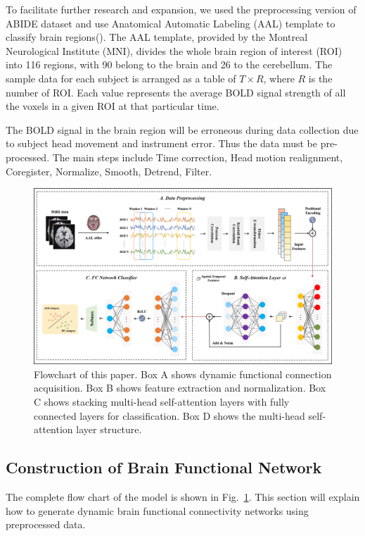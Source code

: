 \documentclass[a4paper]{cas-dc}
\newcommand{\figref}[1]{Fig.~\ref{#1}}
\begin{document}
To facilitate further research and expansion, we used the preprocessing version of ABIDE dataset and use Anatomical Automatic Labeling (AAL) template to classify brain regions(\cite{rolls2015implementation}). The AAL template, provided by the Montreal Neurological Institute (MNI), divides the whole brain region of interest (ROI) into 116 regions, with 90 belong to the brain and 26 to the cerebellum. The sample data for each subject is arranged as a table of $T\times R$, where $R$ is the number of ROI. Each value represents the average BOLD signal strength of all the voxels in a given ROI at that particular time.

The BOLD signal in the brain region will be erroneous during data collection due to subject head movement and instrument error. Thus the data must be pre-processed. The main steps include Time correction, Head motion realignment, Coregister, Normalize, Smooth, Detrend, Filter.

\begin{figure}[t]
	\centering
	\includegraphics[width=\textwidth]{imgs/model.png}
	\caption{Flowchart of this paper. Box A shows dynamic functional connection acquisition. Box B shows feature extraction and normalization. Box C shows stacking multi-head self-attention layers with fully connected layers for classification. Box D shows the multi-head self-attention layer structure.}
	\label{fig1}
\end{figure} 

\subsection{Construction of Brain Functional Network}
The complete flow chart of the model is shown in \figref{fig1}. This section will explain how to generate dynamic brain functional connectivity networks using preprocessed data. 
\end{document}
